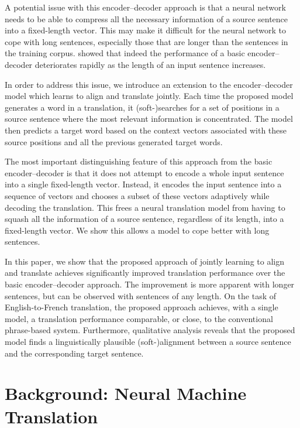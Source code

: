\documentclass{article}
\begin{document}
A potential issue with this encoder--decoder approach is that a neural network
needs to be able to compress all the necessary information of a source sentence
into a fixed-length vector.  This may make it difficult for the neural network
to cope with long sentences, especially those that are longer than the
sentences in the training corpus.  \citet{Cho2014a} showed that indeed the
performance of a basic encoder--decoder deteriorates rapidly as the length of
an input sentence increases. 

In order to address this issue, we introduce an extension to the
encoder--decoder model which learns to align and translate jointly. Each time
the proposed model generates a word in a translation, it \mbox{(soft-)searches}
for a set of positions in a source sentence where the most relevant information
is concentrated.  The model then predicts a target word based on the context
vectors associated with these source positions and all the previous generated
target words. 

The most important distinguishing feature of this approach from the basic
encoder--decoder is that it does not attempt to encode a whole input sentence
into a single fixed-length vector. Instead, it encodes the input sentence into
a sequence of vectors and chooses a subset of these vectors adaptively while
decoding the translation. This frees a neural translation model from having to
squash all the information of a source sentence, regardless of its length, into
a fixed-length vector. We show this allows a model to cope better with long
sentences.

In this paper, we show that the proposed approach of jointly learning to align
and translate achieves significantly improved translation performance over the
basic encoder--decoder approach. The improvement is more apparent with longer
sentences, but can be observed with sentences of any length. On the task of
English-to-French translation, the proposed approach achieves, with a single
model, a translation performance comparable, or close, to the conventional
phrase-based system.  Furthermore, qualitative analysis reveals that the
proposed model finds a linguistically plausible \mbox{(soft-)alignment} between
a source sentence and the corresponding target sentence.

\section{Background: Neural Machine Translation}
\end{document}
